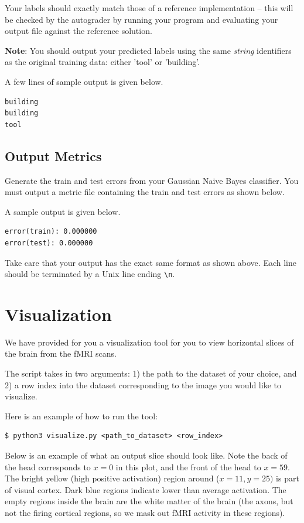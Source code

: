 \documentclass[11pt,addpoints,answers]{exam}
\begin{document}
Your labels should exactly match those of a reference implementation -- this will be checked by the autograder by running your program and evaluating your output file against the reference solution.

\textbf{Note}: You should output your predicted labels using the same \emph{string} identifiers as the original training data: either 'tool' or 'building'. 

A few lines of sample output is given below. 

\begin{lstlisting}
building
building
tool
\end{lstlisting}

\subsection{Output Metrics} \label{metrics}
Generate the train and test errors from your Gaussian Naive Bayes classifier. You must output a metric file containing the train and test errors as shown below. 

A sample output is given below. 

\begin{lstlisting}
error(train): 0.000000
error(test): 0.000000
\end{lstlisting}

Take care that your output has the exact same format as shown above. Each line should be terminated by a Unix line ending \lstinline{\n}.


\section{Visualization}
\label{visualize}
We have provided for you a visualization tool for you to view horizontal slices of the brain from the fMRI scans.

The script takes in two arguments: 1) the path to the dataset of your choice, and 2) a row index into the dataset corresponding to the image you would like to visualize. 

Here is an example of how to run the tool: 
\\
\begin{lstlisting}[language=Shell]
$ python3 visualize.py <path_to_dataset> <row_index>
\end{lstlisting}


Below is an example of what an output slice should look like. Note the back of the head corresponds to $x=0$ in this plot, and the front of the head to $x=59$. The bright yellow (high positive activation) region around ($x=11, y=25)$ is part of visual cortex. Dark blue regions indicate lower than average activation.  The empty regions inside the brain are the white matter of the brain (the axons, but not the firing cortical regions, so we mask out fMRI activity in these regions).
\end{document}
